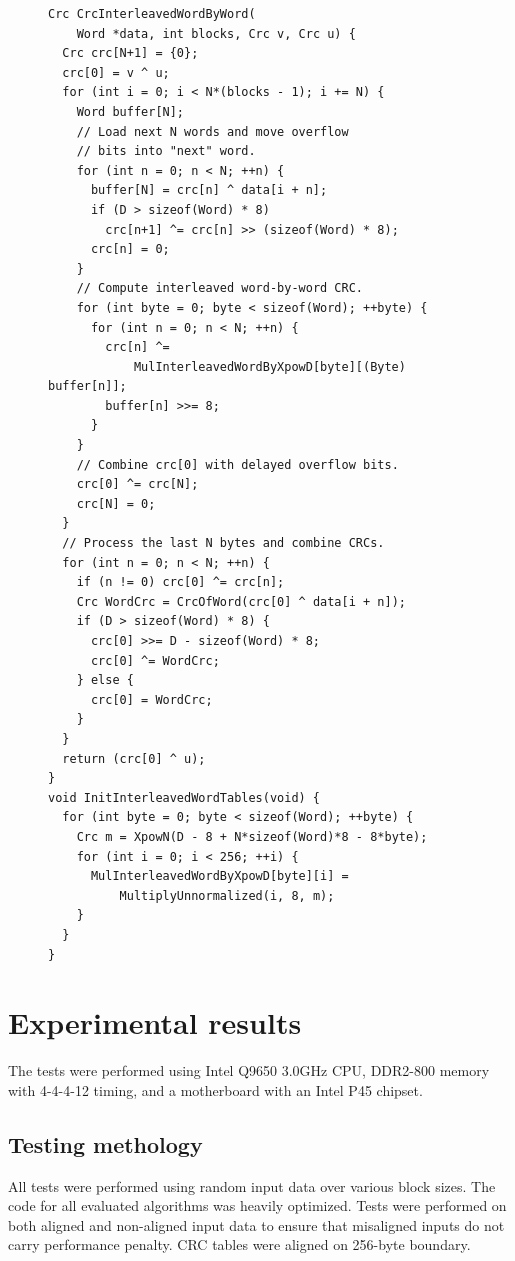 \documentclass{article}
\begin{document}
\begin{figure}
\begin{lstlisting}[caption={Interleaved, word by word CRC computation},label={l:CrcMultiword}]
Crc CrcInterleavedWordByWord(
    Word *data, int blocks, Crc v, Crc u) {
  Crc crc[N+1] = {0};
  crc[0] = v ^ u;
  for (int i = 0; i < N*(blocks - 1); i += N) {
    Word buffer[N];
    // Load next N words and move overflow
    // bits into "next" word.
    for (int n = 0; n < N; ++n) {
      buffer[N] = crc[n] ^ data[i + n];
      if (D > sizeof(Word) * 8)
        crc[n+1] ^= crc[n] >> (sizeof(Word) * 8);
      crc[n] = 0;
    }
    // Compute interleaved word-by-word CRC.
    for (int byte = 0; byte < sizeof(Word); ++byte) {
      for (int n = 0; n < N; ++n) {
        crc[n] ^=
            MulInterleavedWordByXpowD[byte][(Byte) buffer[n]];
        buffer[n] >>= 8;
      }
    }
    // Combine crc[0] with delayed overflow bits.
    crc[0] ^= crc[N];
    crc[N] = 0;
  }
  // Process the last N bytes and combine CRCs.
  for (int n = 0; n < N; ++n) {
    if (n != 0) crc[0] ^= crc[n];
    Crc WordCrc = CrcOfWord(crc[0] ^ data[i + n]);
    if (D > sizeof(Word) * 8) {
      crc[0] >>= D - sizeof(Word) * 8;
      crc[0] ^= WordCrc;
    } else {
      crc[0] = WordCrc;
    }
  }
  return (crc[0] ^ u);
}
void InitInterleavedWordTables(void) {
  for (int byte = 0; byte < sizeof(Word); ++byte) {
    Crc m = XpowN(D - 8 + N*sizeof(Word)*8 - 8*byte);
    for (int i = 0; i < 256; ++i) {
      MulInterleavedWordByXpowD[byte][i] =
          MultiplyUnnormalized(i, 8, m);
    }
  }
}
\end{lstlisting}
\end{figure}


\section{Experimental results}

The tests were performed using Intel Q9650 3.0GHz CPU, DDR2-800 memory with
4-4-4-12 timing, and a motherboard with an Intel P45 chipset.


\subsection{Testing methology}

All tests were performed using random input data over various block sizes.
The code for all evaluated algorithms was heavily optimized. Tests were
performed on both aligned and non-aligned input data to ensure that
misaligned inputs do not carry performance penalty. CRC tables were aligned
on 256-byte boundary.
\end{document}
